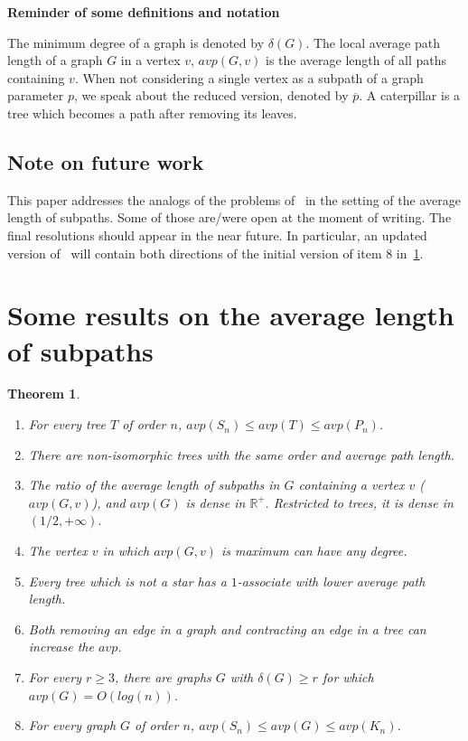 \documentclass[a4paper,11pt]{article}
\newtheorem{thm}[defi]{Theorem}
\newcommand*{\avp}{avp}
\begin{document}
\textbf{Reminder of some definitions and notation}

The minimum degree of a graph is denoted by $\delta(G).$
The local average path length of a graph $G$ in a vertex $v$, $\avp(G,v)$ is the average length of all paths containing $v$.
When not considering a single vertex as a subpath of a graph parameter $p$, we speak about the reduced version, denoted by $\overline p.$
A caterpillar is a tree which becomes a path after removing its leaves.


\subsection{Note on future work}

This paper addresses the analogs of the problems of~\cite{jamison_average_1983,jamison_monotonicity_1984} in the setting of the average length of subpaths.
Some of those are/were open at the moment of writing.
The final resolutions should appear in the near future. In particular, an updated version of~\cite{CJW25} will contain both directions of the initial version of item 8 in~\cref{thm:main}.


\section{Some results on the average length of subpaths}\label{sec:avp}

\begin{thm}\label{thm:main}
    \begin{enumerate}
    \item \label{itm:7.1&7.2} For every tree $T$ of order $n$, $\avp(S_n) \le \avp(T) \le \avp(P_n)$.
    \item\label{itm:7.3} There are non-isomorphic trees with the same order and average path length.
    \item\label{itm:7.4} The ratio of the average length of subpaths in $G$ containing a vertex $v$ ($\avp(G,v)$), and $\avp(G)$ is dense in $\mathbb R^+.$ Restricted to trees, it is dense in $(1/2, +\infty).$ 
    \item\label{itm:7.5} The vertex $v$ in which $\avp(G,v)$ is maximum can have any degree.
    \item\label{itm:7.6} Every tree which is not a star has a $1$-associate with lower average path length.
    \item\label{itm:5.6} Both removing an edge in a graph and contracting an edge in a tree can increase the $\avp$.
    \item\label{itm:Vinceconj7} For every $r \ge 3$, there are graphs $G$ with $\delta(G) \ge r$ for which $\avp(G)= O(log(n)).$
    \item\label{itm:2} For every graph $G$ of order $n$, $\avp(S_n) \le \avp(G) \le \avp(K_n)$.
    \end{enumerate}
\end{thm}
\end{document}
